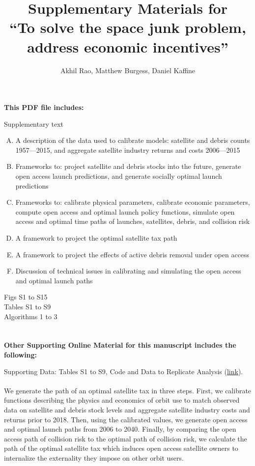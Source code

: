 \documentclass[12pt]{article}
\title{Supplementary Materials for\\``To solve the space junk problem, address economic incentives''}
\author{Akhil Rao, Matthew Burgess, Daniel Kaffine}
\begin{document}
	
	\maketitle
	
	\hspace{-1.25cm}
	\textbf{This PDF file includes:}
	
	\hspace{-1cm}
	Supplementary text
	\begin{enumerate}[A.]
		\item A description of the data used to calibrate models: satellite and debris counts 1957---2015, and aggregate satellite industry returns and costs 2006---2015
		\item Frameworks to: project satellite and debris stocks into the future, generate open access launch predictions, and generate socially optimal launch predictions
		\item Frameworks to: calibrate physical parameters, calibrate economic parameters, compute open access and optimal launch policy functions, simulate open access and optimal time paths of launches, satellites, debris, and collision risk
		\item A framework to project the optimal satellite tax path
		\item A framework to project the effects of active debris removal under open access
		\item Discussion of technical issues in calibrating and simulating the open access and optimal launch paths
	\end{enumerate}
	Figs S1 to S15\\
	Tables S1 to S9\\
	Algorithms 1 to 3 \\~\\~\\
	
	\textbf{Other Supporting Online Material for this manuscript includes the following:}
	
	Supporting Data: Tables S1 to S9, Code and Data to Replicate Analysis (\href{https://github.com/akhilrao/tragedy-space-commons}{link}).
\newpage
\paragraph{}%

We generate the path of an optimal satellite tax in three steps. First, we calibrate functions describing the physics and economics of orbit use to match observed data on satellite and debris stock levels and aggregate satellite industry costs and returns prior to 2018. Then, using the calibrated values, we generate open access and optimal launch paths from 2006 to 2040. Finally, by comparing the open access path of collision risk to the optimal path of collision risk, we calculate the path of the optimal satellite tax which induces open access satellite owners to internalize the externality they impose on other orbit users. \\
\end{document}
